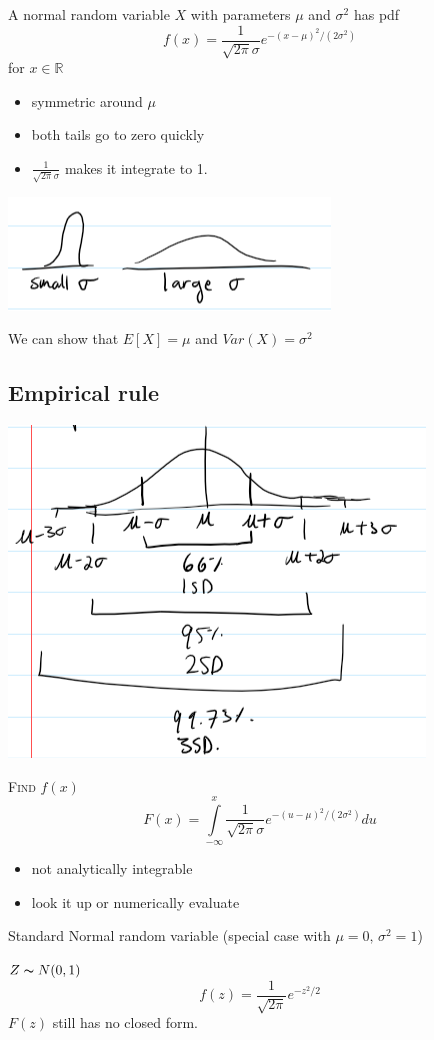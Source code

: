 \begin{defbox}
    A normal random variable $ X $ with parameters $ \mu $ and $ \sigma^2 $ has pdf
    \[ f(x)=\frac{1}{\sqrt{2\pi}\sigma}e^{-(x-\mu)^2/(2\sigma^2)}\]
    for $ x\in\mathbb{R} $
\end{defbox}
\begin{itemize}
    \item symmetric around $ \mu $
    \item both tails go to zero quickly
    \item $\frac{1}{\sqrt{2\pi}\sigma}$ makes it integrate to 1.
\end{itemize}

\begin{center}
    \includegraphics{sigma.png}
\end{center}
We can show that $ E[X]=\mu $ and $ Var(X)=\sigma^2 $

\subsection{Empirical rule}
\begin{center}
    \includegraphics{emp.png}
\end{center}

\textsc{Find $ f(x) $}
\[ F(x)=\int\limits_{-\infty}^{x} \frac{1}{\sqrt{2\pi}\sigma}e^{-(u-\mu)^2/(2\sigma^2)} d{u} \]
\begin{itemize}
    \item not analytically integrable
    \item look it up or numerically evaluate
\end{itemize}
Standard Normal random variable (special case with $ \mu=0,\,\sigma^2=1 $)

$ Z \thicksim N(0,1) $
\[ f(z)=\frac{1}{\sqrt{2\pi}}e^{-z^2/2} \]
$ F(z) $ still has no closed form.